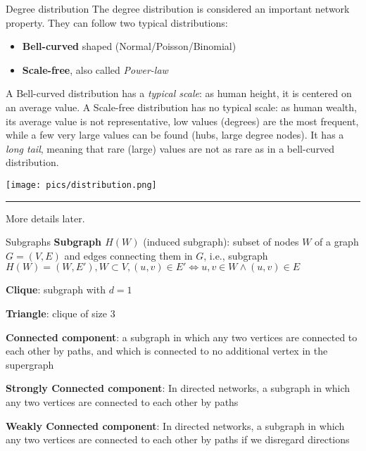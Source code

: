 \begin{textbox}{Degree distribution}
    The degree distribution is considered an important network property. They can follow two typical distributions:
    \begin{itemize}
        \item \textbf{Bell-curved} shaped (Normal/Poisson/Binomial)
        \item \textbf{Scale-free}, also called \textit{Power-law}
    \end{itemize}
    A Bell-curved distribution has a \textit{typical scale}: as human height, it is centered on an average value. A Scale-free distribution has no typical scale: as human wealth, its average value is not representative, low values (degrees) are the most frequent, while a few very large values can be found (hubs, large degree nodes). It has a \textit{long tail}, meaning that rare (large) values are not as rare as in a bell-curved distribution.

    \centering
    \texttt{[image: pics/distribution.png]}

    \noindent\rule{4cm}{0.1pt}

    \tiny{
        More details later.}
\end{textbox}


\begin{textbox}{Subgraphs}
    \textbf{Subgraph $H(W)$} (induced subgraph): subset of nodes $W$ of a graph $G=(V,E)$ and edges connecting them in $G$, i.e., subgraph $H(W)=(W,E'), W \subset V, (u,v) \in E' \iff u,v \in W \wedge (u,v) \in E$

    \textbf{Clique}: subgraph with $d=1$

    \textbf{Triangle}: clique of size 3

    \textbf{Connected component}: a subgraph in which any two vertices are connected to each other by paths, and which is connected to no additional vertex in the supergraph

    \textbf{Strongly Connected component}: In directed networks, a subgraph in which any two vertices are connected to each other by paths

    \textbf{Weakly Connected component}: In directed networks, a subgraph in which any two vertices are connected to each other by paths if we disregard directions
\end{textbox}


